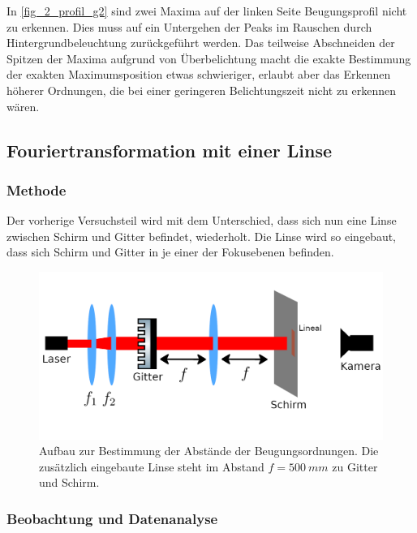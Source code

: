 \documentclass[
	a4paper,
	12pt,
	pagesize,
	ngerman
]{scrartcl}
\begin{document}
	In \cref{fig_2_profil_g2} sind zwei Maxima auf der linken Seite Beugungsprofil nicht zu erkennen.
	Dies muss auf ein Untergehen der Peaks im Rauschen durch Hintergrundbeleuchtung zurückgeführt werden.
	Das teilweise Abschneiden der Spitzen der Maxima aufgrund von Überbelichtung macht die exakte Bestimmung der exakten Maximumsposition etwas schwieriger, erlaubt aber das Erkennen höherer Ordnungen, die bei einer geringeren Belichtungszeit nicht zu erkennen wären.

	\subsection{Fouriertransformation mit einer Linse} \label{ss_3_beug}

	\subsubsection*{Methode}

		Der vorherige Versuchsteil wird mit dem Unterschied, dass sich nun eine Linse zwischen Schirm und Gitter befindet, wiederholt.
		Die Linse wird so eingebaut, dass sich Schirm und Gitter in je einer der Fokusebenen befinden.

	\begin{figure}[H]
			\includegraphics[width=1\linewidth]{img/gitterlinse}
			\caption{
				Aufbau zur Bestimmung der Abstände der Beugungsordnungen. Die zusätzlich eingebaute Linse steht im Abstand $f=\SI{500}{mm}$ zu Gitter und Schirm.
			}
			\label{fig_gitterlinse}
	\end{figure}

	\subsubsection*{Beobachtung und Datenanalyse}
\end{document}
